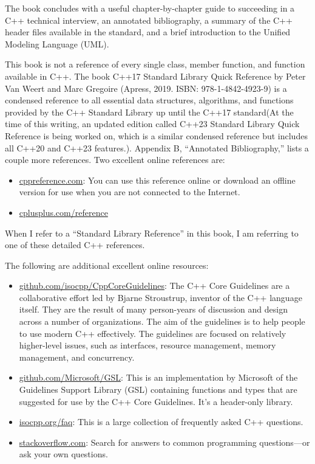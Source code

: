 The book concludes with a useful chapter-by-chapter guide to succeeding in a C++ technical interview, an annotated bibliography, a summary of the C++ header files available in the standard, and a brief introduction to the Unified Modeling Language (UML).

This book is not a reference of every single class, member function, and function available in C++. The book C++17 Standard Library Quick Reference by Peter Van Weert and Marc Gregoire (Apress, 2019. ISBN: 978-1-4842-4923-9) is a condensed reference to all essential data structures, algorithms, and functions provided by the C++ Standard Library up until the C++17 standard(At the time of this writing, an updated edition called C++23 Standard Library Quick Reference is being worked on, which is a similar condensed reference but includes all C++20 and C++23 features.). Appendix B, “Annotated Bibliography,” lists a couple more references. Two excellent online references are:

\begin{itemize}
\item
\url{cppreference.com}: You can use this reference online or download an offline version for use when you are not connected to the Internet.

\item
\url{cplusplus.com/reference}
\end{itemize}

When I refer to a “Standard Library Reference” in this book, I am referring to one of these detailed C++ references.

The following are additional excellent online resources:

\begin{itemize}
\item
\url{github.com/isocpp/CppCoreGuidelines}: The C++ Core Guidelines are a collaborative effort led by Bjarne Stroustrup, inventor of the C++ language itself. They are the result of many person-years of discussion and design across a number of organizations. The aim of the guidelines is to help people to use modern C++ effectively. The guidelines are focused on relatively higher-level issues, such as interfaces, resource management, memory management, and concurrency.

\item
\url{github.com/Microsoft/GSL}: This is an implementation by Microsoft of the Guidelines Support Library (GSL) containing functions and types that are suggested for use by the C++ Core Guidelines. It’s a header-only library.

\item
\url{isocpp.org/faq}: This is a large collection of frequently asked C++ questions.

\item
\url{stackoverflow.com}: Search for answers to common programming questions—or ask your own questions.
\end{itemize}

